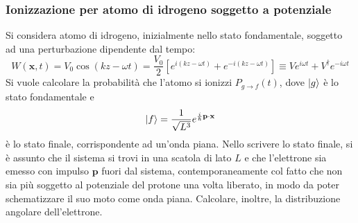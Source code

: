 \documentclass[11pt, a4paper]{scrartcl} %
\numberwithin{equation}{subsection}
\theoremstyle{style2}
\theoremstyle{style1}
\begin{document}
\subsubsection{Ionizzazione per atomo di idrogeno soggetto a potenziale}
Si considera atomo di idrogeno, inizialmente nello stato fondamentale, soggetto ad una perturbazione dipendente dal tempo:
\[
W(\mathbf{x} ,t) = V_0 \cos (kz -\omega t) = \frac{V_0}{2} \left[ e^{i(kz-\omega t)} +  e^{-i(kz-\omega t)}  \right] \equiv V e^{i\omega t} + V^\dagger e^{-i\omega t} 
\] 
Si vuole calcolare la probabilit\`a che l'atomo si ionizzi $P_{g\to f} (t)$, dove $\ket{g} $ \`e lo stato fondamentale e
\[
\ket{f} = \frac{1}{\sqrt{L^3} }e^{\frac{i}{\hbar }\mathbf{p} \cdot \mathbf{x} } 
\] 
\`e lo stato finale, corrispondente ad un'onda piana. 
Nello scrivere lo stato finale, si \`e assunto che il sistema si trovi in una scatola di lato $L$ e che l'elettrone sia emesso con impulso $\mathbf{p} $ fuori  dal sistema, contemporaneamente col fatto che non sia pi\`u soggetto al potenziale del protone una volta liberato, in modo da poter schematizzare il suo moto come onda piana.
Calcolare, inoltre, la distribuzione angolare dell'elettrone.
\end{document}

